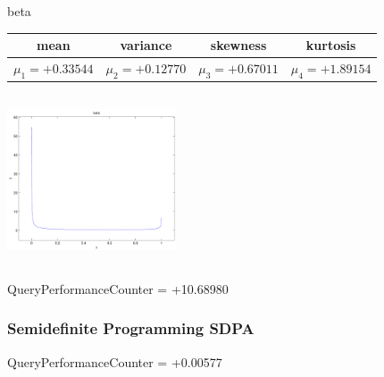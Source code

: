 \documentclass[9pt]{article}
\theoremstyle{plain}
\theoremstyle{definition}
\theoremstyle{remark}
\numberwithin{equation}{section}
\begin{document}
\newpage
beta \begin{tabular}{|c|c|c|c|}  mean & variance & skewness & kurtosis \\  \hline
$\mu_1 = +0.33544$ & $\mu_2 = +0.12770$ & $\mu_3 = +0.67011$ & $\mu_4 =+1.89154$ \\
\end{tabular}

\includegraphics[width=5cm,height=5cm]{beta.pdf}

QueryPerformanceCounter  =  +10.68980
\subsubsection{Semidefinite Programming SDPA}
QueryPerformanceCounter  =  +0.00577
\end{document}

